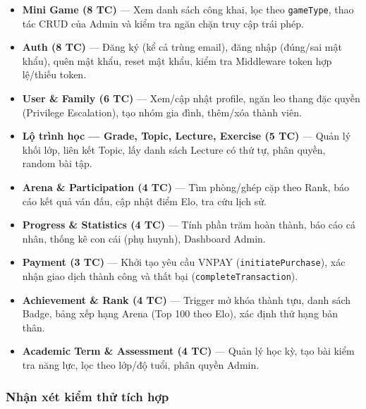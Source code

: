 \begin{itemize}[leftmargin=*]
  \item \textbf{Mini Game (8 TC)} --- Xem danh sách công khai, lọc theo \texttt{gameType},
        thao tác CRUD của Admin và kiểm tra ngăn chặn truy cập trái phép.
  \item \textbf{Auth (8 TC)} --- Đăng ký (kể cả trùng email), đăng nhập (đúng/sai mật khẩu),
        quên mật khẩu, reset mật khẩu, kiểm tra Middleware token hợp lệ/thiếu token.
  \item \textbf{User \& Family (6 TC)} --- Xem/cập nhật profile, ngăn leo thang đặc quyền
        (Privilege Escalation), tạo nhóm gia đình, thêm/xóa thành viên.
  \item \textbf{Lộ trình học --- Grade, Topic, Lecture, Exercise (5 TC)} --- Quản lý khối lớp,
        liên kết Topic, lấy danh sách Lecture có thứ tự, phân quyền, random bài tập.
  \item \textbf{Arena \& Participation (4 TC)} --- Tìm phòng/ghép cặp theo Rank,
        báo cáo kết quả ván đấu, cập nhật điểm Elo, tra cứu lịch sử.
  \item \textbf{Progress \& Statistics (4 TC)} --- Tính phần trăm hoàn thành, báo cáo
        cá nhân, thống kê con cái (phụ huynh), Dashboard Admin.
  \item \textbf{Payment (3 TC)} --- Khởi tạo yêu cầu VNPAY (\texttt{initiatePurchase}),
        xác nhận giao dịch thành công và thất bại (\texttt{completeTransaction}).
  \item \textbf{Achievement \& Rank (4 TC)} --- Trigger mở khóa thành tựu, danh sách Badge,
        bảng xếp hạng Arena (Top 100 theo Elo), xác định thứ hạng bản thân.
  \item \textbf{Academic Term \& Assessment (4 TC)} --- Quản lý học kỳ, tạo bài kiểm tra
        năng lực, lọc theo lớp/độ tuổi, phân quyền Admin.
\end{itemize}

\subsubsection{Nhận xét kiểm thử tích hợp}

